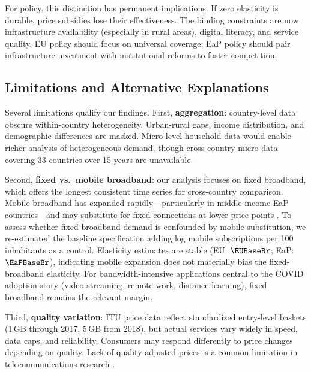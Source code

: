 For policy, this distinction has permanent implications. If zero elasticity is durable,
price subsidies lose their effectiveness. The binding
constraints are now infrastructure availability (especially in rural areas),
digital literacy, and service quality. EU policy should focus
on universal coverage; EaP policy should pair infrastructure investment with
institutional reforms to foster competition.

\subsection{Limitations and Alternative Explanations}

Several limitations qualify our findings. First, \textbf{aggregation}: country-level data obscure within-country heterogeneity. Urban-rural gaps, income distribution, and demographic differences are masked. Micro-level household data would enable richer analysis of heterogeneous demand, though cross-country micro data covering 33 countries over 15 years are unavailable.

Second, \textbf{fixed vs.\ mobile broadband}: our analysis focuses on fixed broadband, which
offers the longest consistent time series for cross-country comparison. Mobile broadband has
expanded rapidly---particularly in middle-income EaP countries---and may substitute for fixed
connections at lower price points \citep{gruber2014mobile}. To assess whether fixed-broadband
demand is confounded by mobile substitution, we re-estimated the baseline specification
adding log mobile subscriptions per 100 inhabitants as a control. Elasticity estimates are
stable (EU: $\EUBaseBr$; EaP: $\EaPBaseBr$), indicating mobile expansion does not materially bias
the fixed-broadband elasticity. For bandwidth-intensive applications central to the COVID
adoption story (video streaming, remote work, distance learning), fixed broadband remains
the relevant margin.

Third, \textbf{quality variation}: ITU price data reflect standardized entry-level baskets (1\,GB through 2017, 5\,GB from 2018), but actual services vary widely in speed, data caps, and reliability. Consumers may respond differently to price changes depending on quality. Lack of quality-adjusted prices is a common limitation in telecommunications research \citep{greenstein2016measuring}.

